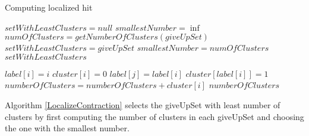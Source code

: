 \begin{algorithm}
\caption{Computing localized hit}
\label{LocalizeContraction}
\begin{algorithmic}[1]
\State $setWithLeastClusters = null$
\State $smallestNumber = \inf$
\State $numOfClusters = getNumberOfClusters(giveUpSet)$
\State $setWithLeastClusters = giveUpSet$
\State $smallestNumber = numOfClusters$
\EndIf
\EndFor
\State \Return $setWithLeastClusters$
\EndFunction
\end{algorithmic}


\begin{algorithmic}[1]
\State $label[i]=i$
\EndFor
{}
\State $cluster[i]=0$
\EndFor
{}
\State $label[j] = label[i]$
\EndIf
\EndFor
\EndFor
{}
\State $cluster[label[i]]=1$
\EndFor
{}
\State $numberOfClusters = numberOfClusters + cluster[i]$
\EndFor 
\State \Return $numberOfClusters$
\EndFunction
\end{algorithmic}
\end{algorithm}

Algorithm \ref{LocalizeContraction} selects the giveUpSet with least number of clusters by first computing the number of clusters in each giveUpSet and choosing the one with the smallest number.